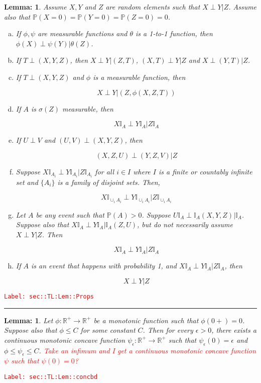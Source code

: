 \documentclass[12pt]{article}
\newcommand{\mb}{\mathbb}
\newcommand{\ra}{\rightarrow}
\newcommand{\ep}{\epsilon}
\newcommand{\tr}{\textcolor{red}}
\newcommand{\labe}[1]{\tr{\texttt{Label: #1}}}
\newcommand{\lin}{\rule{\linewidth}{0.4 pt}}
\newcommand{\pr}{\mb{P}}							%
\newtheorem{lem}[thms]{Lemma: }
\begin{document}
\begin{lem}
Assume \(X,Y\) and \(Z\) are random elements such that \(X\perp Y|Z\). Assume also that \(\pr(X=0) = \pr(Y=0) = \pr(Z=0) = 0\).

\begin{enumerate}[(a)]
\item If \(\phi,\psi\) are measurable functions and \(\theta\) is a 1-to-1 function, then \(\phi(X)\perp \psi(Y)|\theta(Z)\).

\item If \(T\perp(X,Y,Z)\), then \(X\perp Y|(Z,T)\), \((X,T)\perp Y|Z\) and \(X\perp (Y,T)|Z\).

\item If \(T\perp (X,Y,Z)\) and \(\phi\) is a measurable function, then

\[X\perp Y|(Z,\phi(X,Z,T))\]

\item If \(A\) is \(\sigma(Z)\) measurable, then 

\[X\mb{I}_A\perp Y\mb{I}_A|Z\mb{I}_A\]

\item If \(U\perp V\) and \((U,V)\perp(X,Y,Z)\), then 

\[(X,Z,U)\perp (Y,Z,V)|Z\]

\item Suppose \(X\mb{I}_{A_i}\perp Y\mb{I}_{A_i}|Z\mb{I}_{A_i}\) for all \(i\in I\) where \(I\) is a finite or countably infinite set and \(\{A_i\}\) is a family of disjoint sets. Then,

\[X\mb{I}_{\cup_i A_i}\perp Y\mb{I}_{\cup_i A_i}|Z\mb{I}_{\cup_i A_i}\]

\item Let \(A\) be any event such that \(\pr(A) > 0\). Suppose \(U\mb{I}_A\perp \mb{I}_A(X,Y,Z)|\mb{I}_A\). Suppose also that \(X\mb{I}_A\perp Y\mb{I}_A|\mb{I}_A(Z,U)\), but do not necessarily assume \(X\perp Y|Z\). Then 

\[X\mb{I}_A\perp Y\mb{I}_A|Z\mb{I}_A\]

\item If \(A\) is an event that happens with probability 1, and \(X\mb{I}_A \perp Y\mb{I}_A |Z\mb{I}_A\), then 

\[X\perp Y |Z\]
\end{enumerate}
\label{sec::TL:Lem::Props}
\end{lem}
\labe{sec::TL:Lem::Props}

\lin

\begin{lem}
Let \(\phi: \mb{R}^+ \ra \mb{R}^+\) be a monotonic function such that \(\phi(0+) = 0\). Suppose also that \(\phi \leq C\) for some constant \(C\). Then for every \(\ep > 0\), there exists a continuous monotonic concave function \(\psi_\ep:\mb{R}^+\ra \mb{R}^+\) such that \(\psi_\ep(0) = \ep\) and \(\phi \leq \psi_\ep\leq C\). \tr{Take an infimum and I get a continuous monotonic concave function \(\psi\) such that \(\psi(0) = 0\)?}
\label{sec::TL:Lem::concbd}
\end{lem}
\labe{sec::TL:Lem::concbd}
\end{document}
